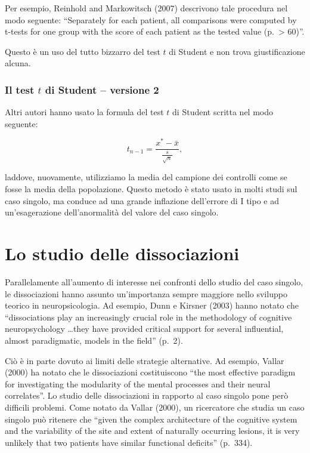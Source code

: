 \documentclass[
  11pt,
]{krantz}
\theoremstyle{definition}
\theoremstyle{definition}
\theoremstyle{definition}
\theoremstyle{definition}
\theoremstyle{remark}
\begin{document}
Per esempio, Reinhold and Markowitsch (2007) descrivono tale procedura nel modo seguente: ``Separately for each patient, all comparisons were computed by t-tests for one group with the score of each patient as the tested value (p.~\textgreater{} 60)''.

Questo è un uso del tutto bizzarro del test \(t\) di Student e non trova giustificazione alcuna.

\hypertarget{il-test-t-di-student-versione-2}{%
\subsubsection{\texorpdfstring{Il test \(t\) di Student -- versione 2}{Il test t di Student -- versione 2}}\label{il-test-t-di-student-versione-2}}

Altri autori hanno usato la formula del test \(t\) di Student scritta nel modo seguente:

\[
t_{n-1} = \frac{x^* - \bar{x}}{\frac{s}{\sqrt{n}}},
\label{eq:ttest-v2}
\]

laddove, nuovamente, utilizziamo la media del campione dei controlli come se fosse la media della popolazione. Questo metodo è stato usato in molti studi sul caso singolo, ma conduce ad una grande inflazione dell'errore di I tipo e ad un'esagerazione dell'anormalità del valore del caso singolo.

\hypertarget{lo-studio-delle-dissociazioni}{%
\section{Lo studio delle dissociazioni}\label{lo-studio-delle-dissociazioni}}

Parallelamente all'aumento di interesse nei confronti dello studio del caso singolo, le dissociazioni hanno assunto un'importanza sempre maggiore nello sviluppo teorico in neuropsicologia. Ad esempio, Dunn e Kirsner (2003) hanno notato che ``dissociations play an increasingly crucial role in the methodology of cognitive neuropsychology \ldots they have provided critical support for several influential, almost paradigmatic, models in the field'' (p.~2).

Ciò è in parte dovuto ai limiti delle strategie alternative. Ad esempio, Vallar (2000) ha notato che le dissociazioni costituiscono ``the most effective paradigm for investigating the modularity of the mental processes and their neural correlates''. Lo studio delle dissociazioni in rapporto al caso singolo pone però difficili problemi. Come notato da Vallar (2000), un ricercatore che studia un caso singolo può ritenere che ``given the complex architecture of the cognitive system and the variability of the site and extent of naturally occurring lesions, it is very unlikely that two patients have similar functional deficits'' (p.~334).
\end{document}
